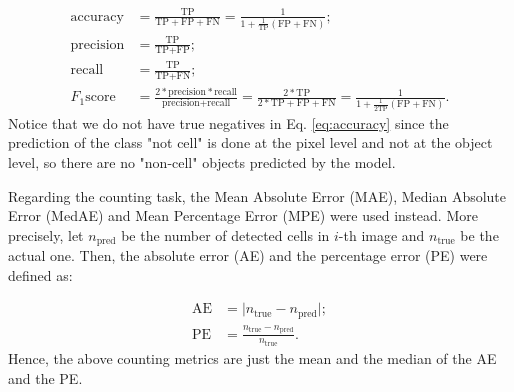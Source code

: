 \begin{align}
\text{accuracy} &=  \frac{\text{TP}}{\text{TP} + \text{FP} + \text{FN}}
= \frac{\text{1}}{\text{1} + \frac{1}{\text{TP}} \left(\text{FP} + \text{FN}\right)}
\label{eq:accuracy}; \\ 
\text{precision} &=    \frac{\text{TP}}{\text{TP} + \text{FP}}; \\
\text{recall} &=    \frac{\text{TP}}{\text{TP} + \text{FN}}; \\ 
F_1 \text{score} &=  \frac{2 * \text{precision} * \text{recall}}{\text{precision} + \text{recall}}
= \frac{2*\text{TP}}{2*\text{TP} + \text{FP} + \text{FN}} 
= \frac{\text{1}}{\text{1} + \frac{1}{\text{2TP}} \left(\text{FP} + \text{FN}\right)}
\label{eq:F1}.
\end{align}
Notice that we do not have true negatives in Eq. \eqref{eq:accuracy} since the prediction of the class "not cell" is done at the pixel level and not at the object level, so there are no "non-cell" objects predicted by the model.

Regarding the counting task, the Mean Absolute Error (MAE), Median Absolute Error (MedAE) and Mean Percentage Error (MPE) were used instead. More precisely, let $n_{\text{pred}}$ be the number of detected cells in $i$-th image  and $n_{\text{true}}$ be the actual one. Then, the absolute error (AE) and the percentage error (PE) were defined as:

\begin{align}
\text{AE} &= \lvert n_{\text{true}} - n_{\text{pred}}\rvert ;\\
\text{PE} &= \frac{ n_{\text{true}} - n_{\text{pred}}}{n_{\text{true}} 
}.
\end{align}
Hence, the above counting metrics are just the mean and the median of the AE and the PE.


